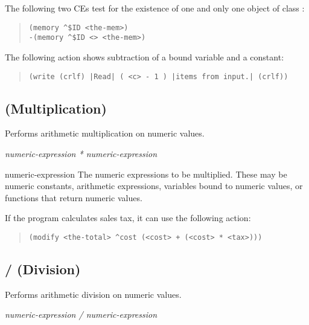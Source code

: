 \Example

The following two CEs test for the existence of one and only one
object of class :

\begin{quote}
\begin{verbatim}
(memory ^$ID <the-mem>)
-(memory ^$ID <> <the-mem>)
\end{verbatim}
\end{quote}

The following action shows subtraction of a bound variable
and a constant:

\begin{quote}
\begin{verbatim}
(write (crlf) |Read| ( <c> - 1 ) |items from input.| (crlf))
\end{verbatim}
\end{quote}

\subsection{\co* (Multiplication)}

Performs arithmetic multiplication on numeric values.

\Format
\it{numeric-expression} * \it{numeric-expression}

\begin{operands}
\item[numeric-expression]
  The numeric expressions to be multiplied. These may be numeric
  constants, arithmetic expressions, variables bound to numeric
  values, or functions that return numeric values.
\end{operands}

\Example

If the  program calculates sales tax, it can use the
following action:

\begin{quote}
\begin{verbatim}
(modify <the-total> ^cost (<cost> + (<cost> * <tax>)))
\end{verbatim}
\end{quote}


\subsection{\co/ (Division)}

Performs arithmetic division on numeric values.

\Format
\it{numeric-expression} \co/ \it{numeric-expression}

